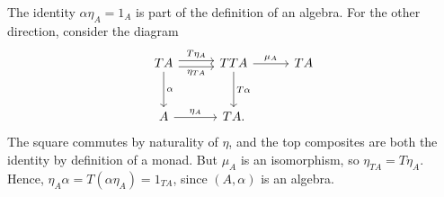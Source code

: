 The identity $\alpha\eta_A = 1_A$ is part of the definition of an algebra.
For the other direction, consider the diagram
\[\begin{tikzcd}[row sep=1cm, column sep=1cm]
	TA\ar[d, "\alpha"]\ar[r, shift right, "\eta_{TA}" below]\ar[r, shift left, "T\eta_A" above] & TTA\ar[r, "\mu_A"]\ar[d, "T\alpha"] & TA\\
	A\ar[r, "\eta_A"] & TA.
\end{tikzcd}\]
The square commutes by naturality of $\eta$, and the top composites are both the
identity by definition of a monad. But $\mu_A$ is an isomorphism, so
$\eta_{TA} = T\eta_A$. Hence, $\eta_A\alpha = T(\alpha\eta_A) = 1_{TA}$, since
$(A, \alpha)$ is an algebra.
